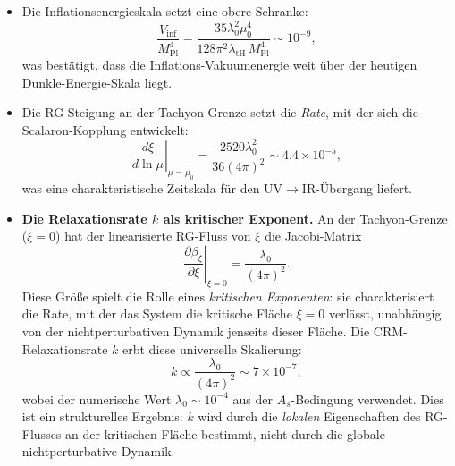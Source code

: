 \documentclass[aps,prd,twocolumn,superscriptaddress,nofootinbib]{revtex4-2}
\begin{document}
\begin{itemize}
\item Die Inflationsenergieskala setzt eine obere Schranke:
\begin{equation}
\frac{V_\mathrm{inf}}{M_\mathrm{Pl}^4} = \frac{35\lambda_0^2\mu_0^4}{128\pi^2\lambda_\mathrm{tH}\,M_\mathrm{Pl}^4} \sim 10^{-9},
\end{equation}
was bestätigt, dass die Inflations-Vakuumenergie weit über der heutigen Dunkle-Energie-Skala liegt.

\item Die RG-Steigung an der Tachyon-Grenze setzt die \textit{Rate}, mit der sich die Scalaron-Kopplung entwickelt:
\begin{equation}
\left.\frac{d\xi}{d\ln\mu}\right|_{\mu=\mu_0} = \frac{2520\lambda_0^2}{36(4\pi)^2} \sim 4.4 \times 10^{-5},
\end{equation}
was eine charakteristische Zeitskala für den UV$\to$IR-Übergang liefert.

\item \textbf{Die Relaxationsrate $k$ als kritischer Exponent.} An der Tachyon-Grenze ($\xi = 0$) hat der linearisierte RG-Fluss von $\xi$ die Jacobi-Matrix
\begin{equation}
\left.\frac{\partial\beta_\xi}{\partial\xi}\right|_{\xi=0} = \frac{\lambda_0}{(4\pi)^2}.
\end{equation}
Diese Größe spielt die Rolle eines \textit{kritischen Exponenten}: sie charakterisiert die Rate, mit der das System die kritische Fläche $\xi = 0$ verlässt, unabhängig von der nichtperturbativen Dynamik jenseits dieser Fläche. Die CRM-Relaxationsrate $k$ erbt diese universelle Skalierung:
\begin{equation}
k \propto \frac{\lambda_0}{(4\pi)^2} \sim 7 \times 10^{-7},
\label{eq:k-critical}
\end{equation}
wobei der numerische Wert $\lambda_0 \sim 10^{-4}$ aus der $A_s$-Bedingung verwendet. Dies ist ein strukturelles Ergebnis: $k$ wird durch die \textit{lokalen} Eigenschaften des RG-Flusses an der kritischen Fläche bestimmt, nicht durch die globale nichtperturbative Dynamik.


\end{itemize}
\end{document}
